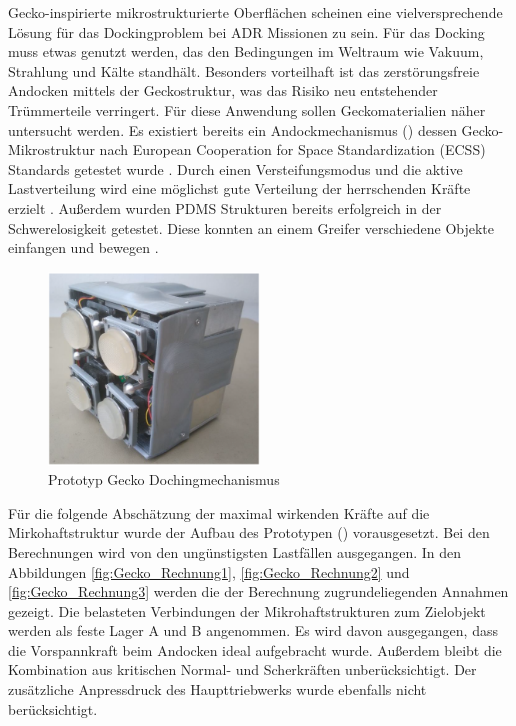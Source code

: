 Gecko-inspirierte mikrostrukturierte Oberflächen scheinen eine vielversprechende Lösung für das Dockingproblem bei ADR Missionen zu sein. Für das Docking muss etwas genutzt werden, das den Bedingungen im Weltraum wie Vakuum, Strahlung und Kälte standhält. Besonders vorteilhaft ist das zerstörungsfreie Andocken mittels der Geckostruktur, was das Risiko neu entstehender Trümmerteile verringert. Für diese Anwendung sollen Geckomaterialien näher untersucht werden. Es existiert bereits ein Andockmechanismus () dessen Gecko-Mikrostruktur nach  European Cooperation for Space Standardization (ECSS) Standards getestet wurde \cite[Seite 10]{ChristopherTrentlage.2018}. Durch einen Versteifungsmodus und die aktive Lastverteilung wird eine möglichst gute Verteilung der herrschenden Kräfte erzielt \cite{ChristopherTrentlage.2018}. Außerdem wurden PDMS Strukturen bereits erfolgreich in der Schwerelosigkeit getestet. Diese konnten an einem Greifer verschiedene Objekte einfangen und bewegen \cite{Schwerter.}.



\begin{figure}[H]
	\centering
		\includegraphics[width=0.50\textwidth]{graphics/Gecko3.PNG}
	\caption{Prototyp Gecko Dochingmechanismus \cite[Figure 18, Seite 10]{Trentlage.}}
	\label{fig:Gecko3}
\end{figure}



Für die folgende Abschätzung der maximal wirkenden Kräfte auf die Mirkohaftstruktur wurde der Aufbau des Prototypen () vorausgesetzt. Bei den Berechnungen wird von den ungünstigsten Lastfällen ausgegangen.
In den Abbildungen \ref{fig:Gecko_Rechnung1}, \ref{fig:Gecko_Rechnung2} und \ref{fig:Gecko_Rechnung3} werden die der Berechnung zugrundeliegenden Annahmen gezeigt. Die belasteten Verbindungen der Mikrohaftstrukturen zum Zielobjekt werden als feste Lager A und B angenommen. Es wird davon ausgegangen, dass die Vorspannkraft beim Andocken ideal aufgebracht wurde. Außerdem bleibt die Kombination aus kritischen Normal- und Scherkräften unberücksichtigt. Der zusätzliche Anpressdruck des Haupttriebwerks wurde ebenfalls nicht berücksichtigt.

